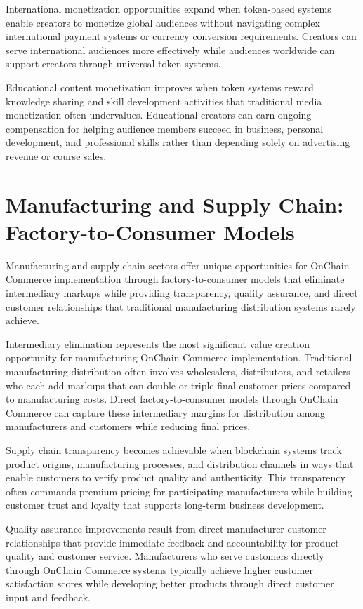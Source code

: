 \documentclass[
  Letterpaper,
]{scrbook}
\begin{document}
International monetization opportunities expand when token-based systems
enable creators to monetize global audiences without navigating complex
international payment systems or currency conversion requirements.
Creators can serve international audiences more effectively while
audiences worldwide can support creators through universal token
systems.

Educational content monetization improves when token systems reward
knowledge sharing and skill development activities that traditional
media monetization often undervalues. Educational creators can earn
ongoing compensation for helping audience members succeed in business,
personal development, and professional skills rather than depending
solely on advertising revenue or course sales.

\section{Manufacturing and Supply Chain: Factory-to-Consumer
Models}\label{manufacturing-and-supply-chain-factory-to-consumer-models}

Manufacturing and supply chain sectors offer unique opportunities for
OnChain Commerce implementation through factory-to-consumer models that
eliminate intermediary markups while providing transparency, quality
assurance, and direct customer relationships that traditional
manufacturing distribution systems rarely achieve.

Intermediary elimination represents the most significant value creation
opportunity for manufacturing OnChain Commerce implementation.
Traditional manufacturing distribution often involves wholesalers,
distributors, and retailers who each add markups that can double or
triple final customer prices compared to manufacturing costs. Direct
factory-to-consumer models through OnChain Commerce can capture these
intermediary margins for distribution among manufacturers and customers
while reducing final prices.

Supply chain transparency becomes achievable when blockchain systems
track product origins, manufacturing processes, and distribution
channels in ways that enable customers to verify product quality and
authenticity. This transparency often commands premium pricing for
participating manufacturers while building customer trust and loyalty
that supports long-term business development.

Quality assurance improvements result from direct manufacturer-customer
relationships that provide immediate feedback and accountability for
product quality and customer service. Manufacturers who serve customers
directly through OnChain Commerce systems typically achieve higher
customer satisfaction scores while developing better products through
direct customer input and feedback.
\end{document}
